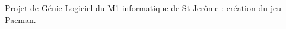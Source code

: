 Projet de Génie Logiciel du M1 informatique de St Jerôme \+: création du jeu \hyperlink{class_pacman}{Pacman}. 